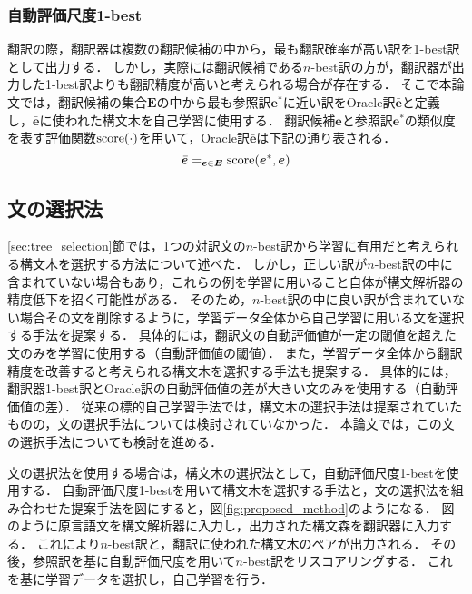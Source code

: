 \documentclass[japanese]{jnlp_1.4}
\newcommand{\argmax}{}
\begin{document}
\subsubsection{自動評価尺度1-best}
\label{sec:bleu_1best}

翻訳の際，翻訳器は複数の翻訳候補の中から，最も翻訳確率が高い訳を1-best訳として出力する．
しかし，実際には翻訳候補である$n$-best訳の方が，翻訳器が出力した1-best訳よりも翻訳精度が高いと考えられる場合が存在する．
そこで本論文では，翻訳候補の集合$\bm{E}$の中から最も参照訳$\bm{e}^*$に近い訳をOracle訳$\bar{\bm{e}}$と定義し，$\bar{\bm{e}}$に使われた構文木を自己学習に使用する．
翻訳候補$\bm{e}$と参照訳$\bm{e}^*$の類似度を表す評価関数$\rm{score}(\cdot)$を用いて，Oracle訳$\bar{\bm{e}}$は下記の通り表される．
\begin{equation}
\bar{\bm{e}} = \argmax_{\bm{e}\in \bm{E}} {\rm score} (\bm{e}^*,\bm{e})
\end{equation}


\subsection{文の選択法}
\label{sec:sentence_selection}

\ref{sec:tree_selection}節では，1つの対訳文の$n$-best訳から学習に有用だと考えられる構文木を選択する方法について述べた．
しかし，正しい訳が$n$-best訳の中に含まれていない場合もあり，これらの例を学習に用いること自体が構文解析器の精度低下を招く可能性がある．
そのため，$n$-best訳の中に良い訳が含まれていない場合その文を削除するように，学習データ全体から自己学習に用いる文を選択する手法を提案する．
具体的には，翻訳文の自動評価値が一定の閾値を超えた文のみを学習に使用する（自動評価値の閾値）．
また，学習データ全体から翻訳精度を改善すると考えられる構文木を選択する手法も提案する．
具体的には，翻訳器1-best訳とOracle訳の自動評価値の差が大きい文のみを使用する（自動評価値の差）．
従来の標的自己学習手法では，構文木の選択手法は提案されていたものの，文の選択手法については検討されていなかった．
本論文では，この文の選択手法についても検討を進める．

文の選択法を使用する場合は，構文木の選択法として，自動評価尺度1-bestを使用する．
自動評価尺度1-bestを用いて構文木を選択する手法と，文の選択法を組み合わせた提案手法を図にすると，図\ref{fig:proposed_method}のようになる．
図のように原言語文を構文解析器に入力し，出力された構文森を翻訳器に入力する．
これにより$n$-best訳と，翻訳に使われた構文木のペアが出力される．
その後，参照訳を基に自動評価尺度を用いて$n$-best訳をリスコアリングする．
これを基に学習データを選択し，自己学習を行う．
\end{document}
